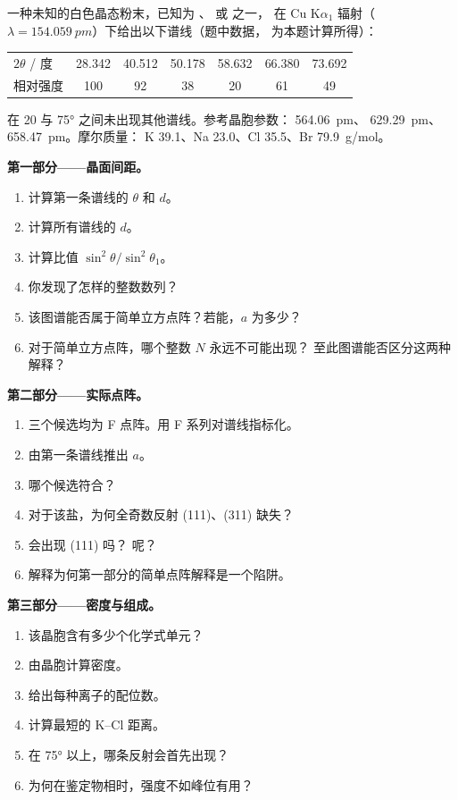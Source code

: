 \begin{problem}
\label{pb:b3:x-ray-diffraction:1}
一种未知的白色晶态粉末，已知为 、 或  之一，
在 Cu K$\alpha_1$ 辐射（$\lambda = \qty{154.059}{pm}$）下给出以下谱线（题中数据，
为本题计算所得）：
\begin{center}\small
\begin{tabular}{lcccccc}
\hline
$2\theta$ / 度 & 28.342 & 40.512 & 50.178 & 58.632 & 66.380 & 73.692 \\
相对强度 & 100 & 92 & 38 & 20 & 61 & 49 \\ \hline
\end{tabular}
\end{center}
在 20 与 \ang{75} 之间未出现其他谱线。参考晶胞参数：
 \qty{564.06}{pm}、 \qty{629.29}{pm}、 \qty{658.47}{pm}。摩尔质量：
K 39.1、Na 23.0、Cl 35.5、Br \qty{79.9}{g/mol}。

\medskip\noindent\textbf{第一部分——晶面间距。}
\begin{enumerate}
  \item 计算第一条谱线的 $\theta$ 和 $d$。
  \item 计算所有谱线的 $d$。
  \item 计算比值 $\sin^2\theta/\sin^2\theta_1$。
  \item 你发现了怎样的整数数列？
  \item 该图谱能否属于简单立方点阵？若能，$a$ 为多少？
  \item 对于简单立方点阵，哪个整数 $N$ 永远不可能出现？
        至此图谱能否区分这两种解释？
\end{enumerate}

\medskip\noindent\textbf{第二部分——实际点阵。}
\begin{enumerate}[resume]
  \item 三个候选均为 F 点阵。用 F 系列对谱线指标化。
  \item 由第一条谱线推出 $a$。
  \item 哪个候选符合？
  \item 对于该盐，为何全奇数反射 (111)、(311) 缺失？
  \item {} 会出现 (111) 吗？ 呢？
  \item 解释为何第一部分的简单点阵解释是一个陷阱。
\end{enumerate}

\medskip\noindent\textbf{第三部分——密度与组成。}
\begin{enumerate}[resume]
  \item 该晶胞含有多少个化学式单元？
  \item 由晶胞计算密度。
  \item 给出每种离子的配位数。
  \item 计算最短的 K--Cl 距离。
  \item 在 \ang{75} 以上，哪条反射会首先出现？
  \item 为何在鉴定物相时，强度不如峰位有用？
\end{enumerate}


\end{problem}
